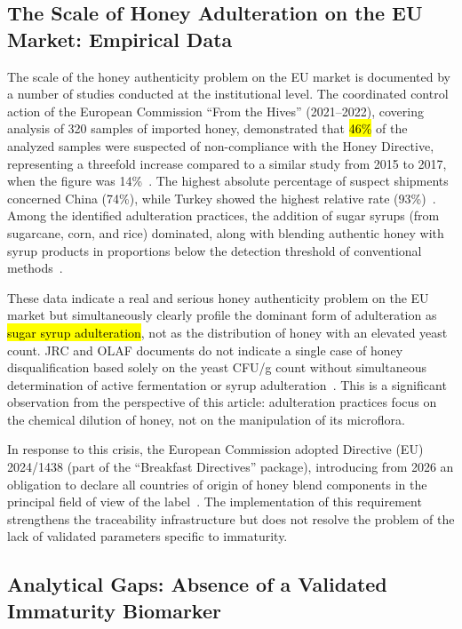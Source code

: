 \documentclass[foods,review,accept,pdftex,moreauthors]{Definitions/mdpi}
\begin{document}
{\subsection{The Scale of Honey Adulteration on the EU Market: Empirical Data}


The scale of the honey authenticity problem on the EU market is
documented by a number of studies conducted at the institutional
level. The coordinated control action of the European Commission
``From the Hives'' (2021--2022), covering analysis of 320 samples
of imported honey, demonstrated that \hl{46\%} of the analyzed
samples were suspected of non-compliance with the Honey Directive,
representing a threefold increase compared to a similar study from
2015 to 2017, when the figure was 14\%~\cite{eufromhives2021}.
The highest absolute percentage of suspect shipments concerned China
(74\%), while Turkey showed the highest relative rate
(93\%)~\cite{eufromhives2021}. Among the identified adulteration
practices, the addition of sugar syrups (from sugarcane, corn, and rice)
dominated, along with blending authentic honey with syrup products
in proportions below the detection threshold of conventional
\mbox{methods~\cite{eufromhives2021,schoder2026}.}

These data indicate a real and serious honey authenticity problem
on the EU market but simultaneously clearly profile the dominant
form of adulteration as \hl{sugar syrup adulteration}, not as
the distribution of honey with an elevated yeast count. JRC and OLAF
documents do not indicate a single case of honey disqualification
based solely on the yeast CFU/g count without simultaneous
determination of active fermentation or syrup
adulteration~\cite{eufromhives2021}. This is a significant
observation from the perspective of this article: adulteration
practices focus on the chemical dilution of honey, not on the manipulation
of its microflora.

In response to this crisis, the European Commission adopted
Directive (EU) 2024/1438 (part of the ``Breakfast Directives''
package), introducing from 2026 an obligation to declare all
countries of origin of honey blend components in the principal
field of view of the label~\cite{cbi_traceability2024}. The
implementation of this requirement strengthens the traceability
infrastructure but does not resolve the problem of the lack of
validated parameters specific to immaturity.


\subsection{Analytical Gaps: Absence of a Validated Immaturity Biomarker}


}
\end{document}
